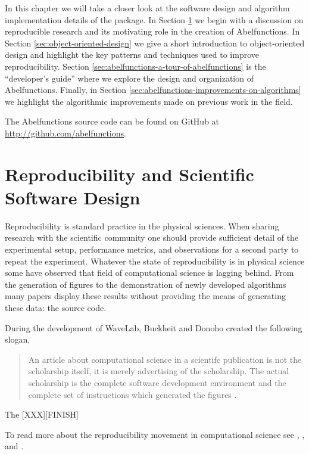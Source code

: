In this chapter we will take a closer look at the software design and algorithm
implementation details of the package. In Section \ref{sec:reproducibility} we
begin with a discussion on reproducible research and its motivating role in the
creation of Abelfunctions. In Section \ref{sec:object-oriented-design} we give a
short introduction to object-oriented design and highlight the key patterns and
techniques used to improve reproducibility. Section
\ref{sec:abelfunctions-a-tour-of-abelfunctions} is the ``developer's guide''
where we explore the design and organization of Abelfunctions. Finally, in
Section \ref{sec:abelfunctions-improvements-on-algorithms} we highlight the
algorithmic improvements made on previous work in the field.

The Abelfunctions source code can be found on GitHub at
\url{http://github.com/abelfunctions}.


\section{Reproducibility and Scientific Software Design}\label{sec:reproducibility}

Reproducibility is standard practice in the physical sciences. When sharing
research with the scientific community one should provide sufficient detail of
the experimental setup, performance metrics, and observations for a second party
to repeat the experiment. Whatever the state of reproducibility is in physical
science some have observed that field of computational science is lagging
behind. From the generation of figures to the demonstration of newly developed
algorithms many papers display these results without providing the means of
generating these data: the source code.

During the development of WaveLab, Buckheit and Donoho created the following
slogan,
\begin{quotation}
  An article about computational science in a scientifc publication is not the
  scholarship itself, it is merely advertising of the scholarship. The actual
  scholarship is the complete software development environment and the complete
  set of instructions which generated the figures \cite{buckheit1995wavelab}.
\end{quotation}
The [XXX][FINISH]

To read more about the reproducibility movement in computational science see
\cite{peng2011reproducible}, \cite{stodden2012reproducible}, and
\cite{stodden2013best}.



